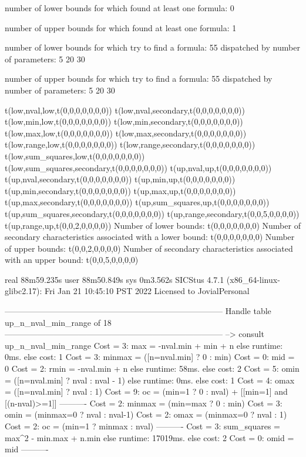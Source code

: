number of lower bounds for which found at least one formula: 0

number of upper bounds for which found at least one formula: 1

number of lower bounds for which try to find a formula: 55
dispatched by number of parameters: 5  20  30

number of upper bounds for which try to find a formula: 55
dispatched by number of parameters: 5  20  30

t(low,nval,low,t(0,0,0,0,0,0,0))
t(low,nval,secondary,t(0,0,0,0,0,0,0))
t(low,min,low,t(0,0,0,0,0,0,0))
t(low,min,secondary,t(0,0,0,0,0,0,0))
t(low,max,low,t(0,0,0,0,0,0,0))
t(low,max,secondary,t(0,0,0,0,0,0,0))
t(low,range,low,t(0,0,0,0,0,0,0))
t(low,range,secondary,t(0,0,0,0,0,0,0))
t(low,sum_squares,low,t(0,0,0,0,0,0,0))
t(low,sum_squares,secondary,t(0,0,0,0,0,0,0))
t(up,nval,up,t(0,0,0,0,0,0,0))
t(up,nval,secondary,t(0,0,0,0,0,0,0))
t(up,min,up,t(0,0,0,0,0,0,0))
t(up,min,secondary,t(0,0,0,0,0,0,0))
t(up,max,up,t(0,0,0,0,0,0,0))
t(up,max,secondary,t(0,0,0,0,0,0,0))
t(up,sum_squares,up,t(0,0,0,0,0,0,0))
t(up,sum_squares,secondary,t(0,0,0,0,0,0,0))
t(up,range,secondary,t(0,0,5,0,0,0,0))
t(up,range,up,t(0,0,2,0,0,0,0))
Number of lower bounds:                                             t(0,0,0,0,0,0,0)
Number of secondary characteristics associated with a lower bound:  t(0,0,0,0,0,0,0)
Number of upper bounds:                                             t(0,0,2,0,0,0,0)
Number of secondary characteristics associated with an upper bound: t(0,0,5,0,0,0,0)

real	88m59.235s
user	88m50.849s
sys	0m3.562s
SICStus 4.7.1 (x86_64-linux-glibc2.17): Fri Jan 21 10:45:10 PST 2022
Licensed to JovialPersonal


--------------------------------------------------------------------------------
Handle table up_n_nval_min_range of 18
--------------------------------------------------------------------------------
--> consult up_n_nval_min_range
Cost =  3:  max         = -nval.min + min + n
else runtime: 0ms. else cost: 1
Cost =  3:  minmax      = ([n=nval.min] ? 0 : min) %
Cost =  0:  mid         = 0
Cost =  2:  rmin        = -nval.min + n
else runtime: 58ms. else cost: 2
Cost =  5:  omin        = ([n=nval.min] ? nval : nval - 1) %
else runtime: 0ms. else cost: 1
Cost =  4:  omax        = ([n=nval.min] ? nval : 1) %
Cost =  9:  oc          = (min=1 ? 0 : nval) + [[min=1] and [(n-nval)>=1]] %
----------
Cost =  2:  minmax      = (min=max ? 0 : min)
Cost =  3:  omin        = (minmax=0 ? nval : nval-1)
Cost =  2:  omax        = (minmax=0 ? nval : 1)
Cost =  2:  oc          = (min=1 ? minmax : nval)
----------
Cost =  3:  sum_squares = max^2 - min.max + n.min
else runtime: 17019ms. else cost: 2
Cost =  0:  omid        = mid
----------

